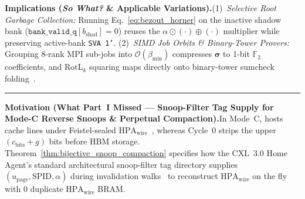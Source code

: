 \documentclass[10pt,twocolumn]{article}
\newcommand{\MidConnesRule}{%
  \par\vspace{4pt}\noindent\textcolor{black!25}{\rule{\textwidth}{0.4pt}}\par\vspace{4pt}%
}
\theoremstyle{spectralthm}
\begin{document}
\noindent\textbf{Implications (\emph{So What?} \& Applicable Variations).}\;(1)~\emph{Selective Root Garbage Collection:} Running Eq.~\eqref{eq:bezout_horner} on the inactive shadow bank ($\texttt{bank\_valid\_q}[b_{\mathrm{shad}}] = 0$) reuses the $\alpha \odot (\cdot) \oplus (\cdot)$ multiplier while preserving active-bank \texttt{SVA 1'}. (2)~\emph{SIMD Job Orbits \& Binary-Tower Provers:} Grouping 8-rank MPI sub-jobs into $\mathcal{O}(\beta_{\min})$ compresses $\boldsymbol{\sigma}$ to 1-bit $\mathbb{F}_2$ coefficients, and $\mathrm{RotL}_k$ squaring maps directly onto binary-tower sumcheck folding~\cite{diamond2025binius}.
\MidConnesRule
\noindent\textbf{Motivation (What Part~I Missed --- Snoop-Filter Tag Supply for Mode-C Reverse Snoops \& Perpetual Compaction).}\;In Mode~C, hosts cache lines under Feistel-sealed $\mathrm{HPA}_{\mathrm{wire}}$~\cite{li2025aiore}, whereas Cycle~0 strips the upper $(c_{\mathrm{bits}}+g)$ bits before HBM storage. Theorem~\ref{thm:bijective_snoop_compaction} specifies how the CXL~3.0 Home Agent's standard architectural snoop-filter tag directory supplies $(u_{\mathrm{page}}, \mathrm{SPID}, \alpha)$ during invalidation walks~\cite{cxl2025spec,dassharma2024cxl,sun2023demystifying} to reconstruct $\mathrm{HPA}_{\mathrm{wire}}$ on the fly with $0$ duplicate $\mathrm{HPA}_{\mathrm{wire}}$ BRAM.
\end{document}
